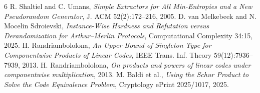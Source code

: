 \documentclass[11pt]{article}
\begin{document}
\begin{thebibliography}{6}
 R. Shaltiel and C. Umans, \emph{Simple Extractors for All Min-Entropies and a New Pseudorandom Generator}, J. ACM 52(2):172--216, 2005.
 D. van Melkebeek and N. Mocelin Sdroievski, \emph{Instance-Wise Hardness and Refutation versus Derandomization for Arthur--Merlin Protocols}, Computational Complexity 34:15, 2025.
 H. Randriambololona, \emph{An Upper Bound of Singleton Type for Componentwise Products of Linear Codes}, IEEE Trans. Inf. Theory 59(12):7936--7939, 2013.
 H. Randriambololona, \emph{On products and powers of linear codes under componentwise multiplication}, 2013.
 M. Baldi et al., \emph{Using the Schur Product to Solve the Code Equivalence Problem}, Cryptology ePrint 2025/1017, 2025.
\end{thebibliography}
\end{document}
